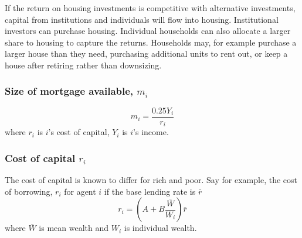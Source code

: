 If the return on housing investments is competitive with alternative investments, capital from institutions and individuals will flow into housing. Institutional investors can purchase housing.  Individual households can also allocate a larger share to housing to capture the returns.
Households may, for example purchase a larger house than they need, purchasing additional units to rent out, or keep a house after retiring rather than downsizing.  %

\subsubsection{Size of mortgage available, $m_i$}
\[m_i= \frac{0.25Y_i}{r_i}\]
where $r_i$ is $i$'s cost of capital, $Y_i$ is $i$'s income.

\subsubsection{Cost of capital $r_i$}
The cost of capital is known to differ for rich and poor. Say for example, the cost of borrowing, $r_i$ for agent $i$ if the base lending rate is $\bar{r}$
 \[ r_i = (A + B \frac{\bar{W}}{W_i})\bar r\]
where $\bar{W}$ is mean wealth and $W_i$ is individual wealth. %

